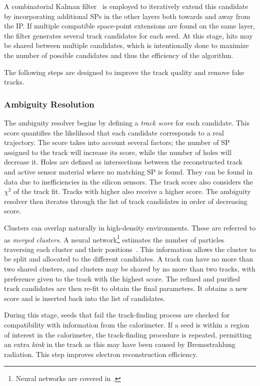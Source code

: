 A combinatorial Kalman filter~\cite{ApplicationKalmanFiltering} is employed to iteratively extend this candidate by incorporating additional SPs in the other layers both towards and away from the IP\@.
If multiple compatible space-point extensions are found on the same layer, the filter generates several track candidates for each seed.
At this stage, hits may be shared between multiple candidates, which is intentionally done to maximize the number of possible candidates and thus the efficiency of the algorithm.

The following steps are designed to improve the track quality and remove fake tracks.

\subsubsection{Ambiguity Resolution}

The ambiguity resolver begins by defining a \textit{track score} for each candidate.
This score quantifies the likelihood that each candidate corresponds to a real trajectory.
The score takes into account several factors; the number of \Gls{SP} assigned to the track will increase its score, while the number of holes will decrease it.
Holes are defined as intersections between the reconstructed track and active sensor material where no matching \Gls{SP} is found.
They can be found in data due to inefficiencies in the silicon sensors.
The track score also considers the $\chi^2$ of the track fit.
Tracks with higher \pt also receive a higher score.
The ambiguity resolver then iterates through the list of track candidates in order of decreasing score.

Clusters can overlap naturally in high-density environments.
These are referred to as \textit{merged clusters}.
A neural network\footnote{Neural networks are covered in .} estimates the number of particles traversing each cluster and their positions~\cite{NeuralNetworkClustering}.
This information allows the cluster to be split and allocated to the different candidates.
A track can have no more than two shared clusters, and clusters may be shared by no more than two tracks, with preference given to the track with the highest score.
The refined and purified track candidates are then re-fit to obtain the final parameters.
It obtains a new score and is inserted back into the list of candidates.

During this stage, seeds that fail the track-finding process are checked for compatibility with information from the calorimeter.
If a seed is within a region of interest in the calorimeter, the track-finding procedure is repeated, permitting an extra \textit{kink} in the track as this may have been caused by Bremsstrahlung radiation.
This step improves electron reconstruction efficiency.

